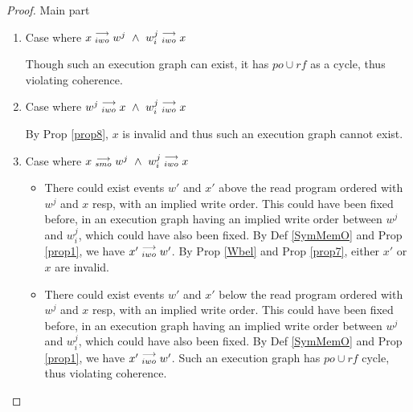 \begin{proof}{Main part}
\begin{itemize}
                        \begin{enumerate}
                            \item Case where $x\stackrel{\longrightarrow}{_{iwo}}w^j \ \wedge \ w_i^j\stackrel{\longrightarrow}{_{iwo}}x$
                        
                                Though such an execution graph can exist, it has  $po \cup rf$ as a cycle, thus violating coherence.
                            
                            \item Case where $w^j\stackrel{\longrightarrow}{_{iwo}}x \ \wedge \ w_i^j\stackrel{\longrightarrow}{_{iwo}}x$
                            
                                By Prop \ref{prop8}, $x$ is invalid and thus such an execution graph cannot exist. 
                            
                            \item Case where $x\stackrel{\longrightarrow}{_{smo}}w^j \ \wedge \ w_i^j\stackrel{\longrightarrow}{_{iwo}}x$
                                
                                \begin{itemize}
                                
                                    \item There could exist events $w'$ and $x'$ above the read program ordered with $w^j$ and $x$ resp, with an implied write order. This could have been fixed before, in an execution graph having an implied write order between $w^j$ and $w_i^j$, which could have also been fixed.
                                    By Def \ref{SymMemO} and Prop \ref{prop1}, we have $x'\stackrel{\longrightarrow}{_{iwo}}w'$.
                                    By Prop \ref{Wbel} and Prop \ref{prop7}, either $x'$ or $x$ are invalid.
                                
                                    \item There could exist events $w'$ and $x'$ below the read program ordered with $w^j$ and $x$ resp, with an implied write order. This could have been fixed before, in an execution graph having an implied write order between $w^j$ and $w_i^j$, which could have also been fixed.
                                    By Def \ref{SymMemO} and Prop \ref{prop1}, we have $x'\stackrel{\longrightarrow}{_{iwo}}w'$.
                                    Such an execution graph has $po \cup rf$ cycle, thus violating coherence. 
                                
                                \end{itemize}
                            

\end{enumerate}
\end{itemize}
\end{proof}

